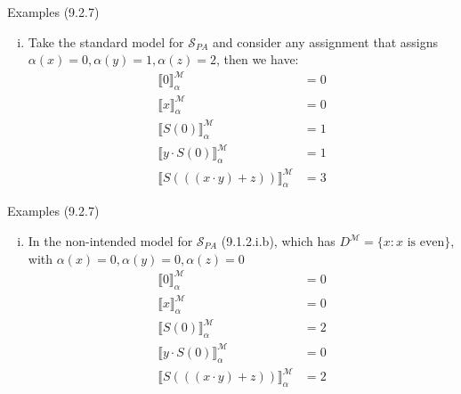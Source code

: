 \begin{frame}{Examples (9.2.7)}

\begin{enumerate}[(i)]
\itemsep=16pt
		
			\item Take the standard model for $\mathcal{S}_{PA}$ and consider any assignment that assigns $\alpha(x)=0,\alpha(y)=1,\alpha(z)=2$, then we have:
			\begin{align*}
			\llbracket 0\rrbracket^\mathcal{M}_\alpha&=0\\
			\llbracket x\rrbracket^\mathcal{M}_\alpha&=0\\
			\llbracket S(0)\rrbracket^\mathcal{M}_\alpha&=1\\
			\llbracket y\cdot S(0)\rrbracket^\mathcal{M}_\alpha&=1\\
			\llbracket S(((x\cdot y)+z))\rrbracket^\mathcal{M}_\alpha&=3
			\end{align*}
			
			
\end{enumerate}
\end{frame}
\begin{frame}{Examples (9.2.7)}

\begin{enumerate}[(i)]
\itemsep=16pt
\setcounter{enumi}{1}			
			\item In the non-intended model for $\mathcal{S}_{PA}$ (9.1.2.i.b), which has $D^\mathcal{M}=\{x:x\text{ is even}\}$, with $\alpha(x)=0,\alpha(y)=0,\alpha(z)=0$
			\begin{align*}
			\llbracket 0\rrbracket^\mathcal{M}_\alpha&=0\\
			\llbracket x\rrbracket^\mathcal{M}_\alpha&=0\\
			\llbracket S(0)\rrbracket^\mathcal{M}_\alpha&=2\\
			\llbracket y\cdot S(0)\rrbracket^\mathcal{M}_\alpha&=0\\
			\llbracket S(((x\cdot y)+z))\rrbracket^\mathcal{M}_\alpha&=2
			\end{align*}
			
	\end{enumerate}
\end{frame}

